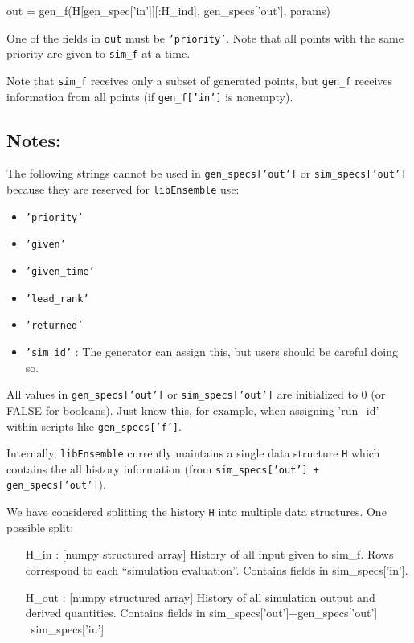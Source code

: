 \documentclass{article}
\newenvironment{allintypewriter}{\ttfamily}{\par}
\newcommand{\libE}{\texttt{libEnsemble}\xspace}
\begin{document}
\begin{allintypewriter}
  out = gen\_f(H[gen\_spec['in']][:H\_ind], gen\_specs['out'], params)\\
\end{allintypewriter}

One of the fields in \texttt{out} must be \texttt{'priority'}. Note that all
points with the same priority are given to \texttt{sim\_f} at a time.

Note that \texttt{sim\_f} receives only a subset of generated points, but
\texttt{gen\_f} receives information from all points (if \texttt{gen\_f['in']}
is nonempty).

\subsection{Notes:}
The following strings cannot be used in  \texttt{gen\_specs['out']} or
\texttt{sim\_specs['out']} because they are reserved for \libE use:
\begin{itemize}
  \item \texttt{'priority'}
  \item \texttt{'given'}
  \item \texttt{'given\_time'}
  \item \texttt{'lead\_rank'}
  \item \texttt{'returned'}
  \item \texttt{'sim\_id'} : The generator can assign this, but users should be
    careful doing so.
\end{itemize}

All values in \texttt{gen\_specs['out']} or \texttt{sim\_specs['out']} are
initialized to 0 (or FALSE for booleans). Just know this, for example, when
assigning 'run\_id' within scripts like \texttt{gen\_specs['f']}.

Internally, \libE currently maintains a single data structure \texttt{H} which
contains the all history information (from \texttt{sim\_specs['out'] +
gen\_specs['out']}).

We have considered splitting the history \texttt{H} into multiple data structures. One possible split:

\begin{allintypewriter}
  \begin{itemize}
    \item[H\_in]: [numpy structured array] History of all input given to
      sim\_f. Rows correspond to each ``simulation evaluation''. Contains fields
      in sim\_specs['in'].

    \item[H\_out]: [numpy structured array] History of all simulation output
      and derived quantities. Contains fields in sim\_specs['out']+gen\_specs['out'] \ sim\_specs['in']
  \end{itemize}
\end{allintypewriter}
\end{document}
